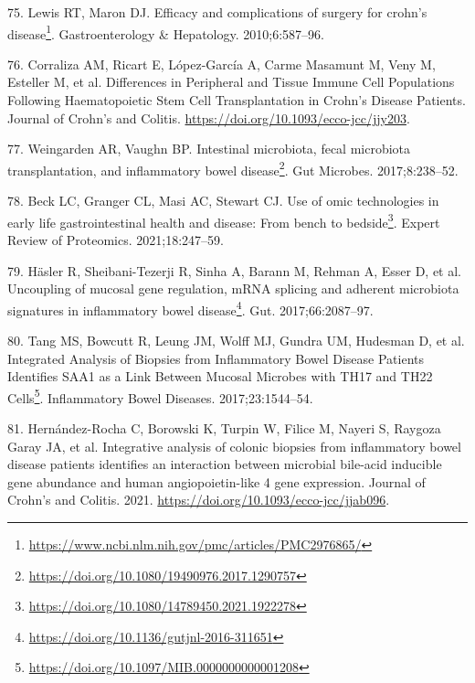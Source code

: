 \documentclass[
  12pt,
  a4paper,
  twoside,
  openright]{book}
\DeclareRobustCommand{\href}[2]{#2\footnote{\url{#1}}}
\newlength{\cslhangindent}
\newlength{\cslentryspacingunit} %
\newenvironment{CSLReferences}[2] %
 {%
  \setlength{\parindent}{0pt}
  \ifodd #1
  \let\oldpar\par
  \def\par{\hangindent=\cslhangindent\oldpar}
  \fi
  \setlength{\parskip}{#2\cslentryspacingunit}
 }%
 {}
\begin{document}
\begin{CSLReferences}{0}{0}
\leavevmode{}%
75. Lewis RT, Maron DJ. \href{https://www.ncbi.nlm.nih.gov/pmc/articles/PMC2976865/}{Efficacy and complications of surgery for crohn's disease}. Gastroenterology \& Hepatology. 2010;6:587--96.

\leavevmode{}%
76. Corraliza AM, Ricart E, López-García A, Carme Masamunt M, Veny M, Esteller M, et al. Differences in Peripheral and Tissue Immune Cell Populations Following Haematopoietic Stem Cell Transplantation in Crohn{'}s Disease Patients. Journal of Crohn's and Colitis. \url{https://doi.org/10.1093/ecco-jcc/jjy203}.

\leavevmode{}%
77. Weingarden AR, Vaughn BP. \href{https://doi.org/10.1080/19490976.2017.1290757}{Intestinal microbiota, fecal microbiota transplantation, and inflammatory bowel disease}. Gut Microbes. 2017;8:238--52.

\leavevmode{}%
78. Beck LC, Granger CL, Masi AC, Stewart CJ. \href{https://doi.org/10.1080/14789450.2021.1922278}{Use of omic technologies in early life gastrointestinal health and disease: From bench to bedside}. Expert Review of Proteomics. 2021;18:247--59.

\leavevmode{}%
79. Häsler R, Sheibani-Tezerji R, Sinha A, Barann M, Rehman A, Esser D, et al. \href{https://doi.org/10.1136/gutjnl-2016-311651}{Uncoupling of mucosal gene regulation, {mRNA} splicing and adherent microbiota signatures in inflammatory bowel disease}. Gut. 2017;66:2087--97.

\leavevmode{}%
80. Tang MS, Bowcutt R, Leung JM, Wolff MJ, Gundra UM, Hudesman D, et al. \href{https://doi.org/10.1097/MIB.0000000000001208}{Integrated Analysis of Biopsies from Inflammatory Bowel Disease Patients Identifies SAA1 as a Link Between Mucosal Microbes with TH17 and TH22 Cells}. Inflammatory Bowel Diseases. 2017;23:1544--54.

\leavevmode{}%
81. Hernández-Rocha C, Borowski K, Turpin W, Filice M, Nayeri S, Raygoza Garay JA, et al. Integrative analysis of colonic biopsies from inflammatory bowel disease patients identifies an interaction between microbial bile-acid inducible gene abundance and human angiopoietin-like 4 gene expression. Journal of Crohn's and Colitis. 2021. \url{https://doi.org/10.1093/ecco-jcc/jjab096}.


\end{CSLReferences}
\end{document}
